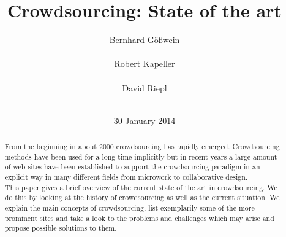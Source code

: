 \documentclass{acm_proc_article-sp}
\begin{document}
  \title{Crowdsourcing: State of the art}

  \author{
    \alignauthor
    Bernhard Gößwein\\
	  \\
    \alignauthor
    Robert Kapeller\\
	  \\
    \alignauthor
    David Riepl\\
	  \\
  } %
  \date{30 January 2014}

  \maketitle
  \begin{abstract}
    From the beginning in about 2000 crowdsourcing has rapidly emerged. Crowdsourcing methods have been used for a long time implicitly but in recent years a large amount of web sites have been established to support the crowdsourcing paradigm in an explicit way in many different fields from microwork to collaborative design.\\
    This paper gives a brief overview of the current state of the art in crowdsourcing. We do this by looking at the history of crowdsourcing as well as the current situation. We explain the main concepts of crowdsourcing, list exemplarily some of the more prominent sites and take a look to the problems and challenges which may arise and propose possible solutions to them. 
  \end{abstract}

\end{document}

